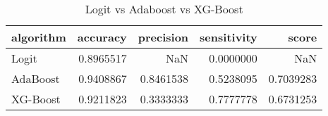 \begin{table}

\caption{Logit vs Adaboost vs XG-Boost}
\centering
\begin{tabular}[t]{lrrrr}
\toprule
algorithm & accuracy & precision & sensitivity & score\\
\midrule
Logit & 0.8965517 & NaN & 0.0000000 & NaN\\
AdaBoost & 0.9408867 & 0.8461538 & 0.5238095 & 0.7039283\\
XG-Boost & 0.9211823 & 0.3333333 & 0.7777778 & 0.6731253\\
\bottomrule
\end{tabular}
\end{table}
